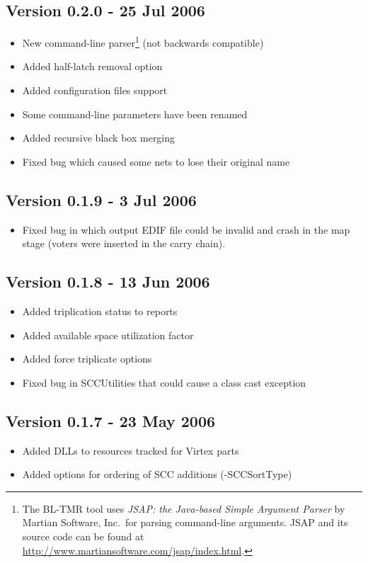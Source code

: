 \documentclass[english]{article}
\numberwithin{figure}{section}
\begin{document}
\subsection*{Version 0.2.0 - 25 Jul 2006}
\begin{itemize}
\item New command-line parser\footnote{The BL-TMR tool uses \emph{JSAP: the 
Java-based Simple Argument Parser} by Martian Software, Inc.\ for parsing 
command-line arguments.  JSAP and its source code can be found at 
\url{http://www.martiansoftware.com/jsap/index.html}.} (not backwards 
compatible)
\item Added half-latch removal option
\item Added configuration files support
\item Some command-line parameters have been renamed
\item Added recursive black box merging
\item Fixed bug which caused some nets to lose their original name
\end{itemize}

\subsection*{Version 0.1.9 - 3 Jul 2006}
\begin{itemize}
\item Fixed bug in which output EDIF file could be invalid and crash in the map 
stage (voters were inserted in the carry chain).
\end{itemize}

\subsection*{Version 0.1.8 - 13 Jun 2006}
\begin{itemize}
\item Added triplication status to reports
\item Added available space utilization factor
\item Added force triplicate options
\item Fixed bug in SCCUtilities that could cause a class cast exception
\end{itemize}

\subsection*{Version 0.1.7 - 23 May 2006}
\begin{itemize}
\item Added DLLs to resources tracked for Virtex parts
\item Added options for ordering of SCC additions (-SCCSortType)
\end{itemize}
\end{document}
